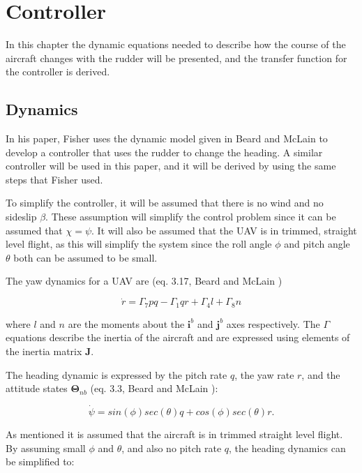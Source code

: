 \section{Controller}

In this chapter the dynamic equations needed to describe how the course of the aircraft changes with the rudder will be presented, and the transfer function for the controller is derived.

\subsection{Dynamics}
In his paper, Fisher \cite{ratcFISHER} uses the dynamic model given in Beard and McLain \cite{suaBEARD} to develop a controller that uses the rudder to change the heading. A similar controller will be used in this paper, and it will be derived by using the same steps that Fisher used.

To simplify the controller, it will be assumed that there is no wind and no sideslip $\beta$. These assumption will simplify the control problem since it can be assumed that $\chi = \psi$. It will also be assumed that the UAV is in trimmed, straight level flight, as this will simplify the system since the roll angle $\phi$ and pitch angle $\theta$ both can be assumed to be small.

The yaw dynamics for a UAV are (eq. 3.17, Beard and McLain \cite{suaBEARD})

\begin{equation}
	\dot{r} = \Gamma_7pq - \Gamma_1qr + \Gamma_4l + \Gamma_8n
	\label{eq:yaw_dynamics}
\end{equation}

where $l$ and $n$ are the moments about the $\bm{i}^b$ and $\bm{j}^b$ axes respectively. The $\Gamma$ equations describe the inertia of the aircraft and are expressed using elements of the inertia matrix $\bm{J}$.

The heading dynamic is expressed by the pitch rate $q$, the yaw rate $r$, and the attitude states $\bm{\Theta}_{nb}$ (eq. 3.3, Beard and McLain \cite{suaBEARD}):

\begin{equation}
	\dot{\psi} = sin(\phi)sec(\theta)q + cos(\phi)sec(\theta)r.
\end{equation}

As mentioned it is assumed that the aircraft is in trimmed straight level flight. By assuming small $\phi$ and $\theta$, and also no pitch rate $q$, the heading dynamics can be simplified to:

